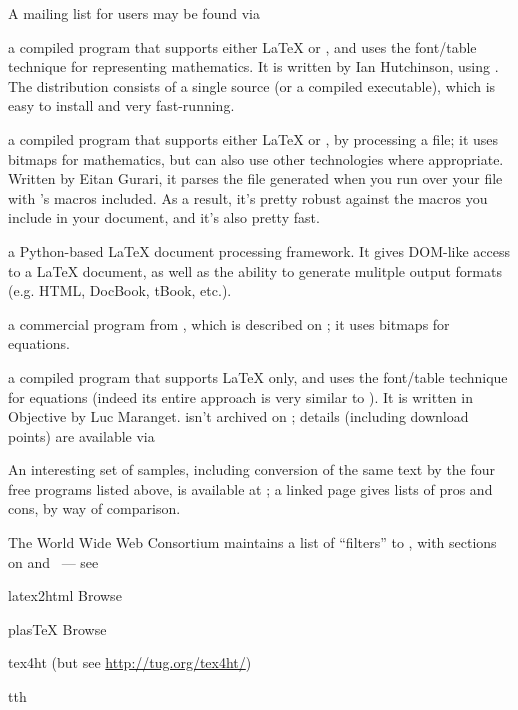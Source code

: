 \begin{description}
  A mailing list for users may be found via
\item[\ProgName{TtH}]a compiled program that supports either \LaTeX{}
  or \plaintex{}, and uses the font/table technique for representing
  mathematics.  It is written by Ian Hutchinson, using
  .  The distribution consists of a single 
  source (or a compiled executable), which is easy to install and very
  fast-running.
\item[\ProgName{TeX4ht}]a compiled program that supports either
  \LaTeX{} or \plaintex{}, by processing a  file; it uses
  bitmaps for mathematics, but can also use other technologies where
  appropriate.  Written by Eitan Gurari, it parses the 
  file generated when you run \AllTeX{} over your file with
  's macros included.  As a result, it's pretty
  robust against the macros you include in your document, and it's
  also pretty fast.
\item[\ProgName{plasTeX}]a Python-based \LaTeX{} document processing
    framework.  It gives DOM-like access to a \LaTeX{} document, as
    well as the ability to generate mulitple output formats
    (e.g. HTML, DocBook, tBook, etc.).
\item[\ProgName{TeXpider}]a commercial program from
  , which is
  described on ;
  it uses bitmaps for equations.
\item[\ProgName{Hevea}] a compiled program that supports \LaTeX{}
  only, and uses the font/table technique for equations (indeed its
  entire approach is very similar to ).  It is written
  in Objective  by Luc Maranget.   isn't
  archived on ; details (including download points) are
  available via 
\end{description}
An interesting set of samples, including conversion of the same text
by the four free programs listed above, is available at
; a linked
page gives lists of pros and cons, by way of comparison.

The World Wide Web Consortium maintains a list of ``filters'' to
, with sections on \AllTeX{} and \BibTeX{}~--- see
\begin{ctanrefs}
\item[latex2html]Browse 
\item[plasTeX]Browse 
\item[tex4ht] (but see \url{http://tug.org/tex4ht/})
\item[tth]
\end{ctanrefs}


